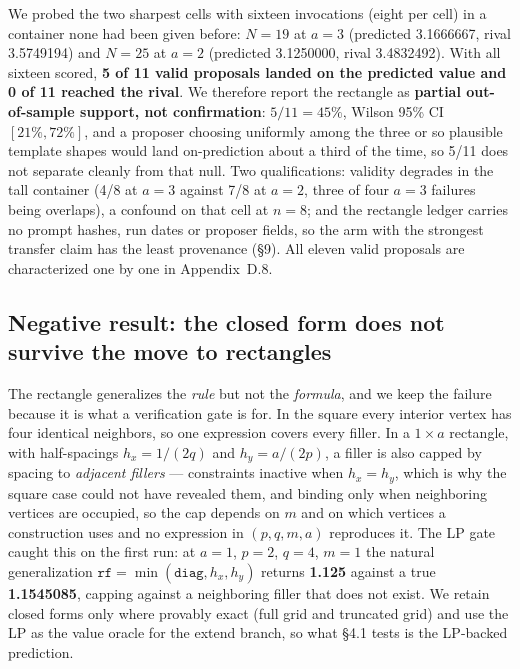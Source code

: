 We probed the two sharpest cells with sixteen invocations (eight per cell) in a container none had
been given before: $N = 19$ at $a = 3$ (predicted 3.1666667, rival 3.5749194) and $N = 25$ at
$a = 2$ (predicted 3.1250000, rival 3.4832492). With all sixteen scored, \textbf{5 of 11 valid
proposals landed on the predicted value and 0 of 11 reached the rival}. We therefore report the
rectangle as \textbf{partial out-of-sample support, not confirmation}: $5/11 = 45\%$, Wilson 95\% CI
$[21\%, 72\%]$, and a proposer choosing uniformly among the three or so plausible template shapes
would land on-prediction about a third of the time, so 5/11 does not separate cleanly from that
null. Two qualifications: validity degrades in the
tall container (4/8 at $a = 3$ against 7/8 at $a = 2$, three of four $a = 3$ failures being
overlaps), a confound on that cell at $n = 8$; and the rectangle ledger carries no prompt hashes,
run dates or proposer fields, so the arm with the strongest transfer claim has the least provenance
(\S9). All eleven valid proposals are characterized one by one in Appendix~D.8.

\subsection{Negative result: the closed form does not survive the move to rectangles}

The rectangle generalizes the \emph{rule} but not the \emph{formula}, and we keep the failure
because it is what a verification gate is for. In the square every interior vertex has four
identical neighbors, so one expression covers every filler. In a $1 \times a$ rectangle, with
half-spacings $h_x = 1/(2q)$ and $h_y = a/(2p)$, a filler is also capped by spacing to
\emph{adjacent fillers} --- constraints inactive when $h_x = h_y$, which is why the square case
could not have revealed them, and binding only when neighboring vertices are occupied, so the cap
depends on $m$ and on which vertices a construction uses and no expression in $(p, q, m, a)$
reproduces it. The LP gate caught this on the first run: at $a = 1$, $p = 2$, $q = 4$, $m = 1$ the
natural generalization $\texttt{rf} = \min(\texttt{diag}, h_x, h_y)$ returns \textbf{1.125} against
a true \textbf{1.1545085}, capping against a neighboring filler that does not exist. We retain
closed forms only where provably exact (full grid and truncated grid) and use the LP as the value
oracle for the extend branch, so what \S4.1 tests is the LP-backed prediction.
